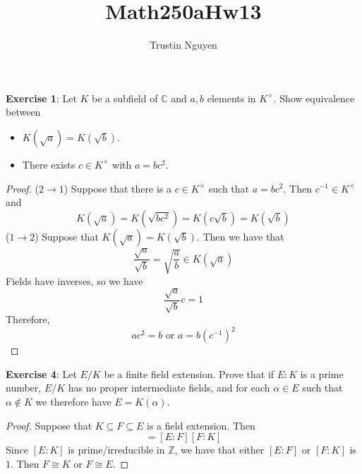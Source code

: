 \documentclass{article}
\title{Math250aHw13}
\author{Trustin Nguyen}
\begin{document}
    \maketitle

\reversemarginpar

\textbf{Exercise 1}: Let $K$ be a subfield of $\mathbb{C}$ and $a, b$ elements in $K^{\times}$. Show equivalence between
    \begin{itemize}
        \item $K(\sqrt{a}) = K(\sqrt{b})$.

        \item There exists $c \in K^{\times}$ with $a = bc^{2}$.
    \end{itemize}
    \begin{proof}
        ($2 \rightarrow 1$) Suppose that there is a $c \in K^{\times}$ such that $a = bc^{2}$. Then $c^{-1} \in K^{\times}$ and
            \begin{equation*}
                K(\sqrt{a}) = K(\sqrt{bc^{2}}) = K(c\sqrt{b}) = K(\sqrt{b})
            \end{equation*}
        ($1 \rightarrow 2$) Suppose that $K(\sqrt{a}) = K(\sqrt{b})$. Then we have that
            \begin{equation*}
                \dfrac{\sqrt{a}}{\sqrt{b}} = \sqrt{\dfrac{a}{b}} \in K(\sqrt{a})
            \end{equation*}
        Fields have inverses, so we have
            \begin{equation*}
                \dfrac{\sqrt{a}}{\sqrt{b}}c = 1
            \end{equation*}
        Therefore, 
            \begin{equation*}
                ac^{2} = b \text{ or } a = b(c^{-1})^{2}
            \end{equation*}
    \end{proof}

\textbf{Exercise 4}: Let $E/K$ be a finite field extension. Prove that if $E : K$ is a prime number, $E/K$ has no proper intermediate fields, and for each $\alpha \in E$ such that $\alpha \notin K$ we therefore have $E = K(\alpha)$.
    \begin{proof}
        Suppose that $K \subseteq F \subseteq E$ is a field extension. Then 
            \begin{equation*}
                [E : K] = [E : F][F : K] 
            \end{equation*}
        Since $[E : K]$ is prime/irreducible in $\mathbb{Z}$, we have that either $[E : F]$ or $[F : K]$ is $1$. Then $F \cong K$ or $F \cong E$.
    \end{proof}
\end{document}

